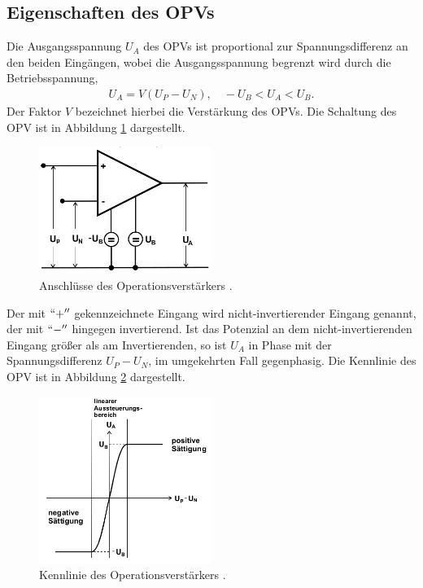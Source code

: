\subsection{Eigenschaften des OPVs}
Die Ausgangsspannung $U_A$ des OPVs ist proportional zur Spannungsdifferenz an den beiden Eingängen, wobei
die Ausgangsspannung begrenzt wird durch die Betriebsspannung,
\begin{align}
 U_A = V(U_P - U_N), \quad -U_B < U_A < U_B.
 \label{eq:Uaus}
\end{align}
Der Faktor $V$ bezeichnet hierbei die Verstärkung des OPVs. Die Schaltung des OPV ist in Abbildung \ref{pic:basic}
dargestellt. 
\begin{figure}[t]
 \includegraphics[width = 0.5\textwidth]{../pics/OPVBasic.png}
 \caption{Anschlüsse des Operationsverstärkers \cite{Anl}.}
 \label{pic:basic}
\end{figure}
Der mit $``+''$ gekennzeichnete Eingang wird nicht-invertierender Eingang genannt, der mit $``-''$ hingegen
invertierend. Ist das Potenzial an dem nicht-invertierenden Eingang größer als am Invertierenden,
so ist $U_A$ in Phase mit der Spannungsdifferenz $U_P-U_N$, im umgekehrten Fall gegenphasig. Die Kennlinie
des OPV ist in Abbildung \ref{pic:linie} dargestellt.
\begin{figure}[t]
 \includegraphics[width = 0.5\textwidth]{../pics/OPVLinie.png}
 \caption{Kennlinie des Operationsverstärkers \cite{Anl}.}
 \label{pic:linie}
\end{figure}
